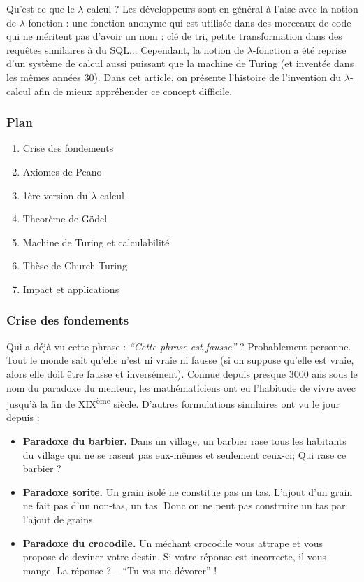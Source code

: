 Qu'est-ce que le $\lambda$-calcul ?
Les développeurs sont en général à l'aise avec la notion de $\lambda$-fonction : une fonction anonyme qui est utilisée dans des morceaux de code qui ne méritent pas d'avoir un nom : clé de tri, petite transformation dans des requêtes similaires à du SQL...
Cependant, la notion de $\lambda$-fonction a été reprise d'un système de calcul aussi puissant que la machine de Turing (et inventée dans les mêmes années 30).
Dans cet article, on présente l'histoire de l'invention du $\lambda$-calcul afin de mieux appréhender ce concept difficile.

\subsubsection*{Plan}
\begin{enumerate}
	\item Crise des fondements
	\item Axiomes de Peano
	\item 1ère version du $\lambda$-calcul
	\item Theorème de Gödel
	\item Machine de Turing et calculabilité
	\item Thèse de Church-Turing
	\item Impact et applications
\end{enumerate}


\subsubsection*{Crise des fondements}
Qui a déjà vu cette phrase : \emph{``Cette phrase est fausse''} ?
Probablement personne.
Tout le monde sait qu'elle n'est ni vraie ni fausse (si on suppose qu'elle est vraie, alors elle doit être fausse et inversément).
Connue depuis presque 3000 ans sous le nom du paradoxe du menteur, les mathématiciens ont eu l'habitude de vivre avec jusqu'à la fin de XIX\textsuperscript{ème} siècle.
D'autres formulations similaires ont vu le jour depuis :
\begin{itemize}
	\item \textbf{Paradoxe du barbier.}
		Dans un village, un barbier rase tous les habitants du village qui ne se rasent pas eux-mêmes et seulement ceux-ci; Qui rase ce barbier ?
	\item \textbf{Paradoxe sorite.}
		Un grain isolé ne constitue pas un tas.
		L'ajout d'un grain ne fait pas d'un non-tas, un tas.
		Donc on ne peut pas construire un tas par l'ajout de grains.
	\item \textbf{Paradoxe du crocodile.}
		Un méchant crocodile vous attrape et vous propose de deviner votre destin.
		Si votre réponse est incorrecte, il vous mange.
		La réponse ? -- ``Tu vas me dévorer'' !
\end{itemize}

